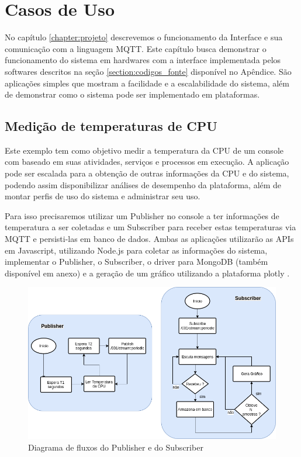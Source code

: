 \chapter{Casos de Uso}
\label{chapter:casos_de_uso}

No capítulo \ref{chapter:projeto} descrevemos o funcionamento da Interface e sua comunicação com a linguagem MQTT. Este capítulo busca demonstrar o funcionamento do sistema em hardwares com a interface implementada pelos softwares descritos na seção \ref{section:codigos_fonte} disponível no Apêndice. São aplicações simples que mostram a facilidade e a escalabilidade do sistema, além de demonstrar como o sistema pode ser implementado em plataformas.

\section{Medição de temperaturas de CPU}
\label{section:temp_cpu}

Este exemplo tem como objetivo medir a temperatura da CPU de um console com baseado em suas atividades, serviços e processos em execução. A aplicação pode ser escalada para a obtenção de outras informações da CPU e do sistema, podendo assim disponibilizar análises de desempenho da plataforma, além de montar perfis de uso do sistema e administrar seu uso.

Para isso precisaremos utilizar um Publisher no console a ter informações de temperatura a ser coletadas e um Subscriber para receber estas temperaturas via MQTT e persisti-las em banco de dados. Ambas as aplicações utilizarão as APIs em Javascript, utilizando Node.js para coletar as informações do sistema, implementar o Publisher, o Subscriber, o driver para MongoDB (também disponível em anexo) e a geração de um gráfico utilizando a plataforma plotly \cite{plotly}.


\begin{figure}[h!]
\centering
\includegraphics[width=11.5cm]{./02_Capitulos/02_Cap4/figures/fluxo_controle_temp}
\caption{Diagrama de fluxos do Publisher e do Subscriber}
\label{fig:4.1.0/fluxo_controle_temp}
\end{figure}

